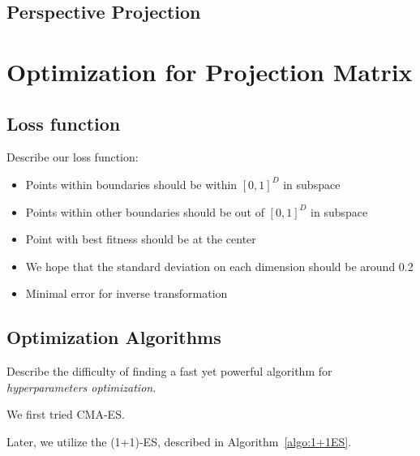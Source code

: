 \subsection{Perspective Projection}





\section{Optimization for Projection Matrix}



\subsection{Loss function}

Describe our loss function:
\begin{itemize}
    \item Points within boundaries should be within $[0, 1]^D$ in subspace
    \item Points within other boundaries should be out of $[0, 1]^D$ in subspace
    \item Point with best fitness should be at the center
    \item We hope that the standard deviation on each dimension should be around 0.2
    \item Minimal error for inverse transformation
\end{itemize}



\subsection{Optimization Algorithms}

Describe the difficulty of finding a fast yet powerful algorithm for \textit{hyperparameters optimization}.

We first tried CMA-ES.

Later, we utilize the (1+1)-ES, described in Algorithm~\ref{algo:1+1ES}.


